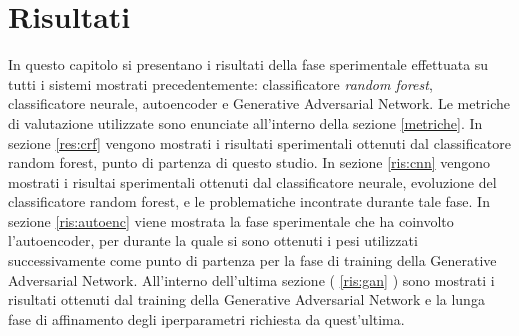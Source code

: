 \chapter{Risultati}
In questo capitolo si presentano i risultati della fase sperimentale effettuata su tutti i sistemi mostrati precedentemente: classificatore \textit{random forest}, classificatore neurale, autoencoder e Generative Adversarial Network. Le metriche di valutazione utilizzate sono enunciate all'interno della sezione \ref{metriche}. In sezione \ref{res:crf} vengono mostrati i risultati sperimentali ottenuti dal classificatore random forest, punto di partenza di questo studio. In sezione \ref{ris:cnn} vengono mostrati i risultai sperimentali ottenuti dal classificatore neurale, evoluzione del classificatore random forest, e le problematiche incontrate durante tale fase. In sezione \ref{ris:autoenc} viene mostrata la fase sperimentale che ha coinvolto l'autoencoder, per durante la quale si sono ottenuti i pesi utilizzati successivamente come punto di partenza per la fase di training della Generative Adversarial Network. All'interno dell'ultima sezione ( \ref{ris:gan} ) sono mostrati i risultati ottenuti dal training della Generative Adversarial Network e la lunga fase di affinamento degli iperparametri richiesta da quest'ultima.

\pagebreak
